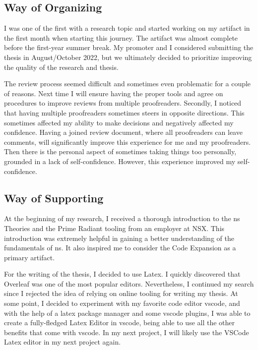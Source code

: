 \subsection{Way of Organizing}

I was one of the first with a research topic and started working on my artifact in the
first month when starting this journey. The artifact was almost complete before the
first-year summer break. My promoter and I considered submitting the thesis in
August/October 2022, but we ultimately decided to prioritize improving the quality of the
research and thesis.

The review process seemed difficult and sometimes even problematic for a couple of
reasons. Next time I will ensure having the proper tools and agree on procedures to
improve reviews from multiple proofreaders. Secondly, I noticed that having multiple
proofreaders sometimes steers in opposite directions. This sometimes affected my ability
to make decisions and negatively affected my confidence. Having a joined review document,
where all proofreaders can leave comments, will significantly improve this experience for
me and my proofreaders. Then there is the personal aspect of sometimes taking things too
personally, grounded in a lack of self-confidence. However, this experience improved my
self-confidence. 

\subsection{Way of Supporting}

At the beginning of my research, I received a thorough introduction to the \gls{ns}
Theories and the Prime Radiant tooling from an employer at NSX. This introduction was
extremely helpful in gaining a better understanding of the fundamentals of \gls{ns}. It
also inspired me to consider the Code Expansion as a primary artifact. 

For the writing of the thesis, I decided to use Latex. I quickly discovered that Overleaf
was one of the most popular editors. Nevertheless, I continued my search since I rejected
the idea of relying on online tooling for writing my thesis. At some point, I decided to
experiment with my favorite code editor \gls{vscode}, and with the help of a latex package
manager and some \gls{vscode} plugins, I was able to create a fully-fledged Latex Editor
in \gls{vscode}, being able to use all the other benefits that come with \gls{vscode}. In
my next project, I will likely use the VSCode Latex editor in my next project again.

